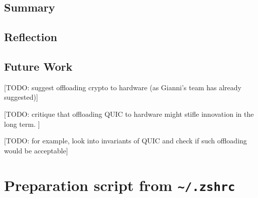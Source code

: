 \documentclass[12pt,a4paper,twoside,openright]{report}
\begin{document}
\section{Summary}

\section{Reflection}

\section{Future Work}
[TODO: suggest offloading crypto to hardware (as Gianni's team has already suggested)]

[TODO: critique that offloading QUIC to hardware might stifle innovation in the long term. ]

[TODO: for example, look into invariants of QUIC and check if such offloading would be acceptable]



\appendix

\chapter{Preparation script from \texttt{\textasciitilde/.zshrc}} \label{preparation_script_from_zshrc}
\end{document}

